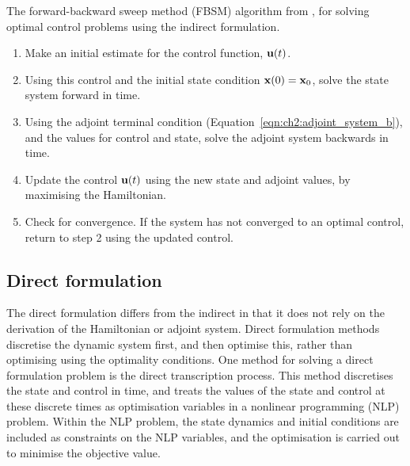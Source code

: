 \begin{algorithm}[h]
    \caption{The forward-backward sweep method (FBSM) algorithm from \citet{lenhart_optimal_2007}, for solving optimal control problems using the indirect formulation.\label{alg:ch2:fbsm}}
    \begin{enumerate}
        \item Make an initial estimate for the control function, $\mathbf{\bm{u}}(t)$.
        \item Using this control and the initial state condition $\mathbf{\bm{x}}(0)=\mathbf{\bm{x}}_0$, solve the state system forward in time.
        \item Using the adjoint terminal condition (Equation~\ref{eqn:ch2:adjoint_system_b}), and the values for control and state, solve the adjoint system backwards in time.
        \item Update the control $\mathbf{\bm{u}}(t)$ using the new state and adjoint values, by maximising the Hamiltonian.
        \item Check for convergence. If the system has not converged to an optimal control, return to step 2 using the updated control.
    \end{enumerate}
\end{algorithm}

\subsection{Direct formulation}

The direct formulation differs from the indirect in that it does not rely on the derivation of the Hamiltonian or adjoint system. Direct formulation methods discretise the dynamic system first, and then optimise this, rather than optimising using the optimality conditions. One method for solving a direct formulation problem is the direct transcription process. This method discretises the state and control in time, and treats the values of the state and control at these discrete times as optimisation variables in a nonlinear programming (NLP) problem. Within the NLP problem, the state dynamics and initial conditions are included as constraints on the NLP variables, and the optimisation is carried out to minimise the objective value.

